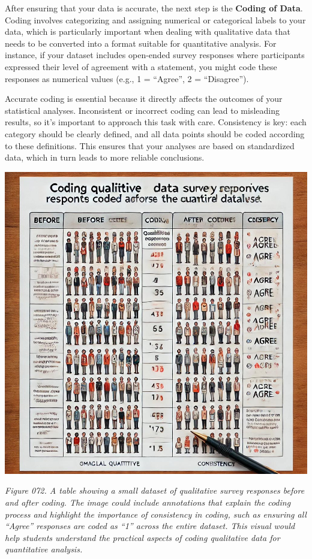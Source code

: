 \documentclass[
]{book}
\begin{document}
After ensuring that your data is accurate, the next step is the \textbf{Coding of Data}. Coding involves categorizing and assigning numerical or categorical labels to your data, which is particularly important when dealing with qualitative data that needs to be converted into a format suitable for quantitative analysis. For instance, if your dataset includes open-ended survey responses where participants expressed their level of agreement with a statement, you might code these responses as numerical values (e.g., 1 = ``Agree'', 2 = ``Disagree'').

Accurate coding is essential because it directly affects the outcomes of your statistical analyses. Inconsistent or incorrect coding can lead to misleading results, so it's important to approach this task with care. Consistency is key: each category should be clearly defined, and all data points should be coded according to these definitions. This ensures that your analyses are based on standardized data, which in turn leads to more reliable conclusions.

\includegraphics[width=1\textwidth,height=\textheight]{images/fig072.jpg}

\emph{Figure 072. A table showing a small dataset of qualitative survey responses before and after coding. The image could include annotations that explain the coding process and highlight the importance of consistency in coding, such as ensuring all ``Agree'' responses are coded as ``1'' across the entire dataset. This visual would help students understand the practical aspects of coding qualitative data for quantitative analysis.}
\end{document}
